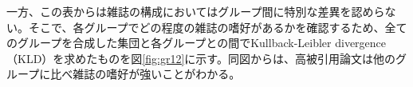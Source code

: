 一方、この表からは雑誌の構成においてはグループ間に特別な差異を認めらない。そこで、各グループでどの程度の雑誌の嗜好があるかを確認するため、全てのグループを合成した集団と各グループとの間でKullback-Leibler divergence（KLD）を求めたものを図\ref{fig:gr12}に示す。同図からは、高被引用論文は他のグループに比べ雑誌の嗜好が強いことがわかる。
